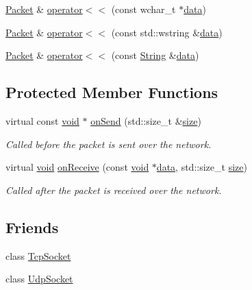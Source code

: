\begin{DoxyCompactItemize}
\item 
\hyperlink{classsf_1_1_packet}{Packet} \& \hyperlink{classsf_1_1_packet_a6f7c6a9ce795fac342ea937896d98016}{operator$<$$<$} (const wchar\-\_\-t $\ast$\hyperlink{gl3_8h_a0f78eecb0891cce3bdfc815b971866a1}{data})
\item 
\hyperlink{classsf_1_1_packet}{Packet} \& \hyperlink{classsf_1_1_packet_a9f3401d038470f629d0c2c6be928a14b}{operator$<$$<$} (const std\-::wstring \&\hyperlink{gl3_8h_a0f78eecb0891cce3bdfc815b971866a1}{data})
\item 
\hyperlink{classsf_1_1_packet}{Packet} \& \hyperlink{classsf_1_1_packet_abc17272df082a36b202e10045bd9e220}{operator$<$$<$} (const \hyperlink{classsf_1_1_string}{String} \&\hyperlink{gl3_8h_a0f78eecb0891cce3bdfc815b971866a1}{data})
\end{DoxyCompactItemize}
\subsection*{Protected Member Functions}
\begin{DoxyCompactItemize}
\item 
virtual const \hyperlink{glutf90_8h_ac778d6f63f1aaf8ebda0ce6ac821b56e}{void} $\ast$ \hyperlink{classsf_1_1_packet_a052e955906c9bfd671622cb625380edc}{on\-Send} (std\-::size\-\_\-t \&\hyperlink{gl3_8h_a79ef9eb3e59c4bb34c4b9fbeb8d28ff7}{size})
\begin{DoxyCompactList}\small\item\em Called before the packet is sent over the network. \end{DoxyCompactList}\item 
virtual \hyperlink{glutf90_8h_ac778d6f63f1aaf8ebda0ce6ac821b56e}{void} \hyperlink{classsf_1_1_packet_ab71a31ef0f1d5d856de6f9fc75434128}{on\-Receive} (const \hyperlink{glutf90_8h_ac778d6f63f1aaf8ebda0ce6ac821b56e}{void} $\ast$\hyperlink{gl3_8h_a0f78eecb0891cce3bdfc815b971866a1}{data}, std\-::size\-\_\-t \hyperlink{gl3_8h_a79ef9eb3e59c4bb34c4b9fbeb8d28ff7}{size})
\begin{DoxyCompactList}\small\item\em Called after the packet is received over the network. \end{DoxyCompactList}\end{DoxyCompactItemize}
\subsection*{Friends}
\begin{DoxyCompactItemize}
\item 
class \hyperlink{classsf_1_1_packet_aa8b32310b01d4bb702d6bcb969d5f130}{Tcp\-Socket}
\item 
class \hyperlink{classsf_1_1_packet_ae128c6687ced82c6157c5f865f8dec5c}{Udp\-Socket}
\end{DoxyCompactItemize}


